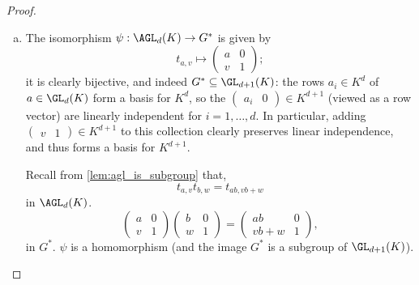 \begin{proof}
    \begin{enumerate}[(a)]
        \item The isomorphism $\psi : \AGL_d(K) \to G^*$ is given by
              $$t_{a,v} \mapsto \begin{pmatrix}
                      a & 0 \\
                      v & 1
                  \end{pmatrix};$$
              it is clearly bijective, and indeed $G^* \subseteq \GL_{d+1}(K)$: the rows $a_i \in K^d$ of $a \in \GL_d(K)$ form a basis for $K^d$, so the $\begin{pmatrix}
                      a_i & 0
                  \end{pmatrix} \in K^{d+1}$ (viewed as a row vector) are linearly independent for $i = 1,\dotsc,d$. In particular, adding $\begin{pmatrix}
                      v & 1
                  \end{pmatrix} \in K^{d+1}$ to this collection clearly preserves linear independence, and thus forms a basis for $K^{d+1}$.

              Recall from \autoref{lem:agl_is_subgroup} that, 
              $$t_{a,v}t_{b,w} = t_{ab,vb+w}$$
              in $\AGL_d(K)$. 
              $$\begin{pmatrix}
                      a & 0 \\
                      v & 1
                  \end{pmatrix}
                  \begin{pmatrix}
                      b & 0 \\
                      w & 1
                  \end{pmatrix} =
                  \begin{pmatrix}
                      ab     & 0 \\
                      vb + w & 1
                  \end{pmatrix},$$
              in $G^*$.  $\psi$ is a homomorphism (and the image $G^*$ is a subgroup of $\GL_{d+1}(K)$).


\end{enumerate}
\end{proof}
